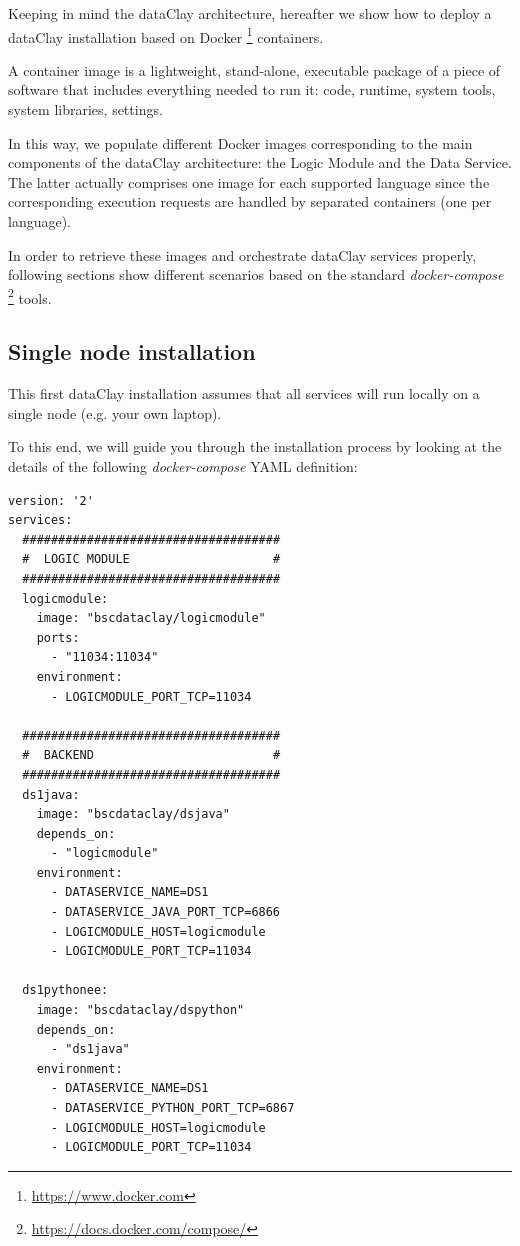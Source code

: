 Keeping in mind the dataClay architecture, hereafter we show how to deploy a dataClay installation based on Docker \footnote{\url{https://www.docker.com}} containers.

A container image is a lightweight, stand-alone, executable package of a piece of software that includes everything needed to run it: code, runtime, system tools, system libraries, settings. 

In this way, we populate different Docker images corresponding to the main components of the dataClay architecture: the Logic Module and the Data Service. The latter actually comprises one image for each supported language since the corresponding execution requests are handled by separated containers (one per language). 

In order to retrieve these images and orchestrate dataClay services properly, following sections show different scenarios based on the standard \textit{docker-compose} \footnote{\url{https://docs.docker.com/compose/}} tools.

\subsection{Single node installation}
\label{sec:SingleNodeInstall}
This first dataClay installation assumes that all services will run locally on a single node (e.g. your own laptop).

To this end, we will guide you through the installation process by looking at the details of the following \textit{docker-compose} YAML definition:

\begin{tBox}
 \begin{lstlisting}[language=docker-compose-2, frame=none]
version: '2' 
services:
  ####################################
  #  LOGIC MODULE                    #
  ####################################
  logicmodule:
    image: "bscdataclay/logicmodule"
    ports:
      - "11034:11034"
    environment:
      - LOGICMODULE_PORT_TCP=11034

  ####################################
  #  BACKEND                         #
  ####################################
  ds1java:
    image: "bscdataclay/dsjava"
    depends_on:
      - "logicmodule"
    environment:
      - DATASERVICE_NAME=DS1
      - DATASERVICE_JAVA_PORT_TCP=6866
      - LOGICMODULE_HOST=logicmodule
      - LOGICMODULE_PORT_TCP=11034

  ds1pythonee:
    image: "bscdataclay/dspython"
    depends_on:
      - "ds1java"
    environment:
      - DATASERVICE_NAME=DS1
      - DATASERVICE_PYTHON_PORT_TCP=6867
      - LOGICMODULE_HOST=logicmodule
      - LOGICMODULE_PORT_TCP=11034
 \end{lstlisting}
\end{tBox}

